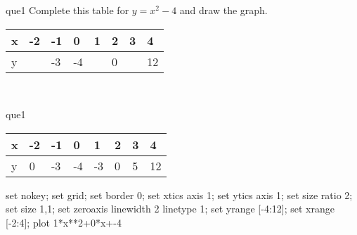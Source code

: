 \documentclass[13.5pt, varwidth=true]{beamer}
\begin{document}
\begin{frame}[shrink=19,fragile]
	\begin{beamercolorbox}[rounded=true, left, shadow=true,wd=14.8cm]{que1}
		 Complete this table for $y = x^{2} - 4$ and draw the graph. \\[0.3cm] \renewcommand{\arraystretch}{1.2}\begin{tabular}{|C|C|C|C|C|C|C|C|} \hline x & -2 & -1 & 0 & 1 & 2 & 3 & 4 \\ \hline y &  & -3 & -4 &  & 0 &  & 12\\ \hline \end{tabular}\\[0.3cm]
	\end{beamercolorbox}
\end{frame}
\begin{frame}[shrink=19,fragile]
	\begin{beamercolorbox}[rounded=true, left, shadow=true,wd=14.8cm]{que1}
		\renewcommand{\arraystretch}{1.2}\begin{tabular}{|C|C|C|C|C|C|C|C|} \hline x & -2 & -1 & 0 & 1 & 2 & 3 & 4 \\ \hline y & 0 & -3 & -4 & -3 & 0 & 5 & 12\\ \hline \end{tabular}\begin{gnuplot}[terminal=pdf] set nokey; set grid; set border 0; set xtics axis 1; set ytics axis 1; set size ratio 2; set size 1,1; set zeroaxis linewidth 2 linetype 1; set yrange [-4:12]; set xrange [-2:4]; plot 1*x**2+0*x+-4 \end{gnuplot}
	\end{beamercolorbox}
\end{frame}
\end{document}
